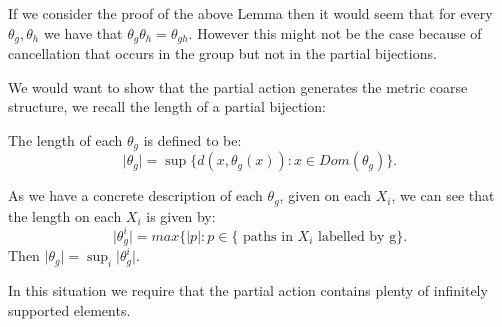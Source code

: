 \begin{remark}
If we consider the proof of the above Lemma then it would seem that for every $\theta_{g},\theta_{h}$ we have that $\theta_{g}\theta_{h} = \theta_{gh}$. However this might not be the case because of cancellation that occurs in the group but not in the partial bijections. 
\end{remark}

\begin{comment}
\begin{figure}[h]

\texttt{[image: Diagrams/Diagram4.png]}

\caption{The composition of the partial action with respect to reduced words $g,h$.}
\label{Fig:F4}
\end{figure}
\end{comment}

We would want to show that the partial action generates the metric coarse structure, we recall the length of a partial bijection:

\begin{definition}
The length of each $\theta_{g}$ is defined to be:
\begin{equation*}
\vert \theta_{g} \vert = \sup \lbrace d(x,\theta_{g}(x)) : x \in Dom(\theta_{g})\rbrace.
\end{equation*} 
\end{definition}

\begin{remark}
As we have a concrete description of each $\theta_{g}$, given on each $X_{i}$, we can see that the length on each $X_{i}$ is given by:
\begin{equation*}
\vert \theta_{g}^{i} \vert = max\lbrace \vert p \vert: p \in \lbrace \mbox{ paths in }X_{i}\mbox{ labelled by g}\rbrace.
\end{equation*} Then $\vert \theta_{g} \vert = \sup_{i} \vert \theta_{g}^{i} \vert$.
\end{remark}

In this situation we require that the partial action contains plenty of infinitely supported elements. 

